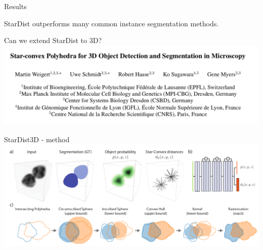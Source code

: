 \documentclass[9pt, aspectratio=169]{beamer}
\begin{document}
\begin{frame}
    {Results}
    \centering

    \footnotesize
    \raggedright
    StarDist outperforms many common instance segmentation methods.
\end{frame}

\begin{frame}
    {Can we extend StarDist to 3D?}
    \centering
    \includegraphics[width=\textwidth]{Weigert2020_title.png}
\end{frame}

\begin{frame}
    {StarDist3D - method}
    \centering
    \includegraphics[width=\textwidth]{Weigert2020_method.png}
\end{frame}
\end{document}
